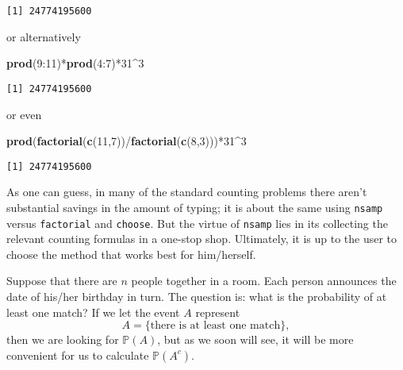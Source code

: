 \documentclass[]{book}
\newenvironment{Shaded}{\begin{snugshade}}{\end{snugshade}}
\newcommand{\KeywordTok}[1]{\textcolor[rgb]{0.13,0.29,0.53}{\textbf{{#1}}}}
\newcommand{\DecValTok}[1]{\textcolor[rgb]{0.00,0.00,0.81}{{#1}}}
\newcommand{\NormalTok}[1]{{#1}}
\numberwithin{equation}{chapter}
\numberwithin{figure}{chapter}
\theoremstyle{plain}
\theoremstyle{definition}
\theoremstyle{remark}
\theoremstyle{definition}
\theoremstyle{definition}
\theoremstyle{remark}
\let\BeginKnitrBlock\begin \let\EndKnitrBlock\end
\begin{document}
\begin{verbatim}
[1] 24774195600
\end{verbatim}

or alternatively

\begin{Shaded}
\begin{Highlighting}[]
\KeywordTok{prod}\NormalTok{(}\DecValTok{9}\NormalTok{:}\DecValTok{11}\NormalTok{)*}\KeywordTok{prod}\NormalTok{(}\DecValTok{4}\NormalTok{:}\DecValTok{7}\NormalTok{)*}\DecValTok{31}\NormalTok{^}\DecValTok{3} 
\end{Highlighting}
\end{Shaded}

\begin{verbatim}
[1] 24774195600
\end{verbatim}

or even

\begin{Shaded}
\begin{Highlighting}[]
\KeywordTok{prod}\NormalTok{(}\KeywordTok{factorial}\NormalTok{(}\KeywordTok{c}\NormalTok{(}\DecValTok{11}\NormalTok{,}\DecValTok{7}\NormalTok{))/}\KeywordTok{factorial}\NormalTok{(}\KeywordTok{c}\NormalTok{(}\DecValTok{8}\NormalTok{,}\DecValTok{3}\NormalTok{)))*}\DecValTok{31}\NormalTok{^}\DecValTok{3} 
\end{Highlighting}
\end{Shaded}

\begin{verbatim}
[1] 24774195600
\end{verbatim}

As one can guess, in many of the standard counting problems there aren't
substantial savings in the amount of typing; it is about the same using
\texttt{nsamp} versus \texttt{factorial} and \texttt{choose}. But the
virtue of \texttt{nsamp} lies in its collecting the relevant counting
formulas in a one-stop shop. Ultimately, it is up to the user to choose
the method that works best for him/herself.

\bigskip

\BeginKnitrBlock{example}[The Birthday Problem]
\protect\hypertarget{ex:unnamed-chunk-150}{}{\label{ex:unnamed-chunk-150}
\iffalse (The Birthday Problem) \fi }Suppose that there are \(n\) people
together in a room. Each person announces the date of his/her birthday
in turn. The question is: what is the probability of at least one match?
If we let the event \(A\) represent \[ A = \{ \mbox{there is at least
one match}\}, \] then we are looking for \(\mathbb{P}(A)\), but as we
soon will see, it will be more convenient for us to calculate
\(\mathbb{P}(A^{c})\).
\EndKnitrBlock{example}
\end{document}
